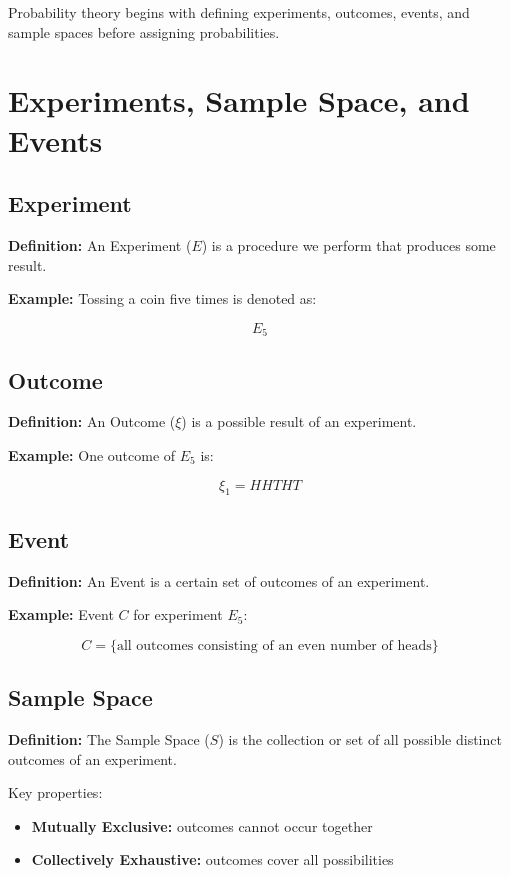 \documentclass[12pt]{article}
\begin{document}
Probability theory begins with defining experiments, outcomes, events, and sample
spaces before assigning probabilities.

\section{Experiments, Sample Space, and Events}

\subsection{Experiment}

\textbf{Definition:}  
An Experiment ($E$) is a procedure we perform that produces some result.

\textbf{Example:}  
Tossing a coin five times is denoted as:

\[
E_5
\]

\subsection{Outcome}

\textbf{Definition:}  
An Outcome ($\xi$) is a possible result of an experiment.

\textbf{Example:}  
One outcome of $E_5$ is:

\[
\xi_1 = HHTHT
\]

\subsection{Event}

\textbf{Definition:}  
An Event is a certain set of outcomes of an experiment.

\textbf{Example:}  
Event $C$ for experiment $E_5$:

\[
C = \{\text{all outcomes consisting of an even number of heads}\}
\]

\subsection{Sample Space}

\textbf{Definition:}  
The Sample Space ($S$) is the collection or set of all possible distinct outcomes of an
experiment.

Key properties:

\begin{itemize}
    \item \textbf{Mutually Exclusive:} outcomes cannot occur together
    \item \textbf{Collectively Exhaustive:} outcomes cover all possibilities
\end{itemize}
\end{document}

